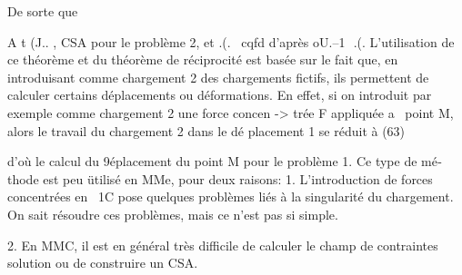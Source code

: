 {De sorte que 

A t
(J.. , CSA pour le problème 2, et 
.(.~ 
cqfd 
d'après oU.--1  
.(. 
L'utilisation de ce théorème et du théorème de réciprocité est basée sur le fait que, en introduisant comme chargement 2 des chargements fictifs, ils permettent de calculer certains déplacements ou déformations. En effet, si on introduit par exemple comme chargement 2 une force concen
->
trée  F  appliquée  a~  point M,  alors  le  travail  du  chargement  2 dans  le dé­ 
placement  1  se  réduit  à  
(63)  

d'où le calcul du 9éplacement du point M pour le problème 1. Ce type de mé­thode est peu ütilisé en MMe, pour deux raisons: 
1. 
L'introduction de forces concentrées en ~1C pose quelques problèmes liés à la singularité du chargement. On sait résoudre ces problèmes, mais ce n'est pas si simple. 

2. 
En MMC, il est en général très difficile de calculer le champ de contrain­tes solution ou de construire un CSA. 


}
